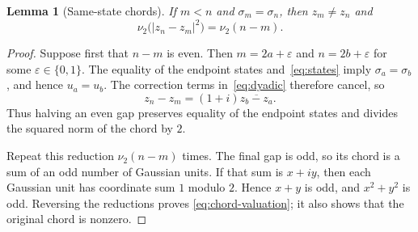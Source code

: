 \documentclass[10pt,reqno]{amsart}
\newcommand{\vTwo}{\nu_2}
\newtheorem{lemma}[theorem]{Lemma}
\newcommand{\vTwo}{\nu_2}
\begin{document}
\begin{lemma}[Same-state chords]\label{lem:chords}
If $m<n$ and $\sigma_m=\sigma_n$, then $z_m\ne z_n$ and
\begin{equation}\label{eq:chord-valuation}
 \vTwo\bigl(|z_n-z_m|^2\bigr)=\vTwo(n-m).
\end{equation}
\end{lemma}

\begin{proof}
Suppose first that $n-m$ is even.  Then $m=2a+\varepsilon$ and
$n=2b+\varepsilon$ for some $\varepsilon\in\{0,1\}$.  The equality of the
endpoint states and~\eqref{eq:states} imply $\sigma_a=\sigma_b$, and hence
$u_a=u_b$.  The correction terms in~\eqref{eq:dyadic} therefore cancel, so
\begin{equation}\label{eq:halving}
 z_n-z_m=(1+i)\overline{z_b-z_a}.
\end{equation}
Thus halving an even gap preserves equality of the endpoint states and divides
the squared norm of the chord by $2$.

Repeat this reduction $\vTwo(n-m)$ times.  The final gap is odd, so its chord
is a sum of an odd number of Gaussian units.  If that sum is $x+iy$, then each
Gaussian unit has coordinate sum $1$ modulo $2$.  Hence $x+y$ is odd, and
$x^2+y^2$ is odd.  Reversing the reductions proves
\eqref{eq:chord-valuation}; it also shows that the original chord is nonzero.
\end{proof}
\end{document}
